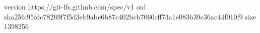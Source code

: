 version https://git-lfs.github.com/spec/v1
oid sha256:95fdc78269f7f5d3eb9abe6b87c402bcb7060cff73a1e083b39e36ac44f010f9
size 1398256
